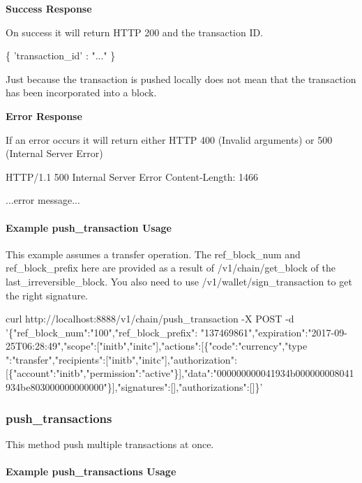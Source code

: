 {\bfseries Success Response} 

On success it will return H\+T\+TP 200 and the transaction ID. 


\begin{DoxyCode}
\{
  \textcolor{stringliteral}{'transaction\_id'} : \textcolor{stringliteral}{"..."}
\}
\end{DoxyCode}


Just because the transaction is pushed locally does not mean that the transaction has been incorporated into a block.

{\bfseries Error Response} 

If an error occurs it will return either H\+T\+TP 400 (Invalid arguments) or 500 (Internal Server Error) 


\begin{DoxyCode}
HTTP/1.1 500 Internal Server Error
Content-Length: 1466

...error message...
\end{DoxyCode}
\hypertarget{group__aaciorpc_examplepushtrx}{}\paragraph{Example push\+\_\+transaction Usage}\label{group__aaciorpc_examplepushtrx}
This example assumes a transfer operation. The {\ttfamily ref\+\_\+block\+\_\+num} and {\ttfamily ref\+\_\+block\+\_\+prefix} here are provided as a result of {\ttfamily /v1/chain/get\+\_\+block} of the last\+\_\+irreversible\+\_\+block. You also need to use /v1/wallet/sign\+\_\+transaction to get the right signature. 
\begin{DoxyCode}
curl  http:\textcolor{comment}{//localhost:8888/v1/chain/push\_transaction -X POST -d
       '\{"ref\_block\_num":"100","ref\_block\_prefix":
      "137469861","expiration":"2017-09-25T06:28:49","scope":["initb","initc"],"actions":[\{"code":"currency","type
      ":"transfer","recipients":["initb","initc"],"authorization":[\{"account":"initb","permission":"active"\}],"data":"000000000041934b000000008041934be803000000000000"\}],"signatures":[],"authorizations":[]\}'}
\end{DoxyCode}
\hypertarget{group__aaciorpc_v1chainpushtransactions}{}\subsubsection{push\+\_\+transactions}\label{group__aaciorpc_v1chainpushtransactions}
This method push multiple transactions at once.\hypertarget{group__aaciorpc_examplepushtrxs}{}\paragraph{Example push\+\_\+transactions Usage}\label{group__aaciorpc_examplepushtrxs}

